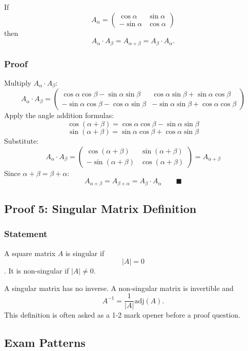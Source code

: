 \documentclass[
]{article}
\begin{document}
If
\[
A_\alpha =
\begin{pmatrix}
\cos\alpha & \sin\alpha \\
-\sin\alpha & \cos\alpha
\end{pmatrix}
\]
then
\[
A_\alpha \cdot A_\beta = A_{\alpha+\beta} = A_\beta \cdot A_\alpha.
\]
\subsubsection{Proof}\label{proof-5}

Multiply \(A_\alpha \cdot A_\beta\):
\[
A_\alpha \cdot A_\beta =
\begin{pmatrix}
\cos\alpha\cos\beta - \sin\alpha\sin\beta & \cos\alpha\sin\beta + \sin\alpha\cos\beta \\
-\sin\alpha\cos\beta - \cos\alpha\sin\beta & -\sin\alpha\sin\beta + \cos\alpha\cos\beta
\end{pmatrix}
\]
Apply the angle addition formulas:
\[
\cos(\alpha+\beta) = \cos\alpha\cos\beta - \sin\alpha\sin\beta
\]
\[
\sin(\alpha+\beta) = \sin\alpha\cos\beta + \cos\alpha\sin\beta
\]
Substitute:
\[
A_\alpha \cdot A_\beta =
\begin{pmatrix}
\cos(\alpha+\beta) & \sin(\alpha+\beta) \\
-\sin(\alpha+\beta) & \cos(\alpha+\beta)
\end{pmatrix} = A_{\alpha+\beta}
\]
Since \(\alpha + \beta = \beta + \alpha\):
\[
A_{\alpha+\beta} = A_{\beta+\alpha} = A_\beta \cdot A_\alpha \qquad \blacksquare
\]

\subsection{Proof 5: Singular Matrix
Definition}\label{proof-5-singular-matrix-definition}

\subsubsection{Statement}\label{statement-7}

A square matrix \(A\) is singular if
\[
\lvert A \rvert = 0
\]
. It is non-singular if \(\lvert A \rvert \neq 0\).

A singular matrix has no inverse. A non-singular matrix is invertible
and
\[
A^{-1} = \frac{1}{\lvert A \rvert}\text{adj}(A).
\]
This definition is often asked as a 1-2 mark opener before a proof
question.

\subsection{Exam Patterns}\label{exam-patterns-19}
\end{document}
